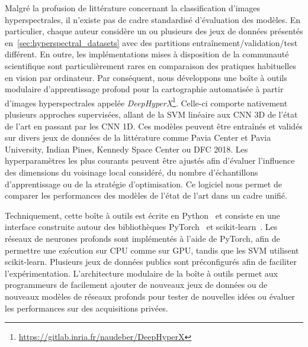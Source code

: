 Malgré la profusion de littérature concernant la classification d'images hyperspectrales, il n'existe pas de cadre standardisé d'évaluation des modèles. En particulier, chaque auteur considère un ou plusieurs des jeux de données présentés en~\cref{sec:hyperspectral_datasets} avec des partitions entraînement/validation/test différent. En outre, les implémentations mises à disposition de la communauté scientifique sont particulièrement rares en comparaison des pratiques habituelles en vision par ordinateur. Par conséquent, nous développons une boîte à outils modulaire d'apprentissage profond pour la cartographie automatisée à partir d'images hyperspectrales appelée \emph{DeepHyperX}\footnote{\url{https://gitlab.inria.fr/naudeber/DeepHyperX}}. Celle-ci comporte nativement plusieurs approches supervisées, allant de la \gls{SVM} linéaire aux \gls{CNN} 3D de l'état de l'art en passant par les \gls{CNN} 1D. Ces modèles peuvent être entraînés et validés sur divers jeux de données de la littérature comme Pavia Center et Pavia University, Indian Pines, Kennedy Space Center ou \gls{DFC} 2018. Les hyperparamètres les plus courants peuvent être ajustés afin d'évaluer l'influence des dimensions du voisinage local considéré, du nombre d'échantillons d'apprentissage ou de la stratégie d'optimisation. Ce logiciel nous permet de comparer les performances des modèles de l'état de l'art dans un cadre unifié.


Techniquement, cette boîte à outils est écrite en Python~\cite{python_software_foundation_python_nodate} et consiste en une interface construite autour des bibliothèques \gls{PyTorch}~\cite{noauthor_pytorch_2016} et \gls{scikit-learn}~\cite{pedregosa_scikit-learn_2011}. Les réseaux de neurones profonds sont implémentés à l'aide de \gls{PyTorch}, afin de permettre une exécution sur \gls{CPU} comme sur \gls{GPU}, tandis que les \gls{SVM} utilisent \gls{scikit-learn}. Plusieurs jeux de données publics sont préconfigurés afin de faciliter l'expérimentation. L'architecture modulaire de la boîte à outils permet aux programmeurs de facilement ajouter de nouveaux jeux de données ou de nouveaux modèles de réseaux profonds pour tester de nouvelles idées ou évaluer les performances sur des acquisitions privées.

